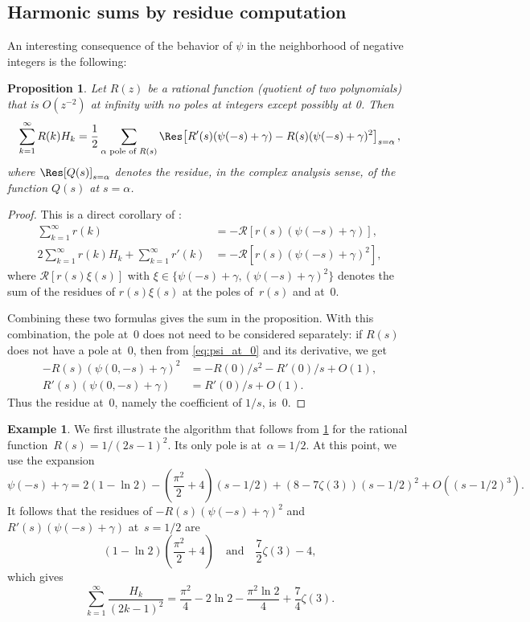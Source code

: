 \documentclass{article}
\newtheorem{proposition}{Proposition}
\theoremstyle{definition}
\newtheorem{example}{Example}
\begin{document}
\subsection{Harmonic sums by residue computation}

An interesting consequence of the behavior of $\psi$ in the neighborhood of negative integers is the following:
\begin{proposition} 
\label{thm:lem1}
Let $R(z)$ be a rational function (quotient of two polynomials) that is $O(z^{-2})$ at infinity with no poles at integers except possibly at 0. Then
\begin{equation}
\sum_{k=1}^\infty R(k) H_k = 
\frac12\sum_{\alpha \text{ pole of } R(s)}
\Res\!\left[R'(s)
(\psi(-s)+\gamma)-R(s) (\psi(-s) + \gamma)^2\right]_{s=\alpha}, \label{form:BSlemma}
\end{equation}
where $\Res [Q(s)]_{s=\alpha}$ denotes the residue, in the complex analysis sense, of the function $Q(s)$ at $s = \alpha$.
\end{proposition}
\begin{proof}
This is a direct corollary of \cite[Eqs.~(2-6) and (2-9)]{FlajoletSalvy}:
\begin{align*}
\sum_{k=1}^\infty{r(k)}&=-\mathcal R[r(s)(\psi(-s)+\gamma)],\\
2\sum_{k=1}^\infty{r(k)H_k}+\sum_{k=1}^\infty{r'(k)}&=
-\mathcal R[r(s)(\psi(-s)+\gamma)^2],
\end{align*}
where $\mathcal R[r(s)\xi(s)]$ with $\xi\in\{\psi (-s)+\gamma,(\psi(-s)+\gamma)^2\}$ denotes the sum of the residues of $r(s)\xi(s)$ at the poles of~$r(s)$ and at~0.

Combining these two formulas gives the sum in the proposition. With this combination, the pole at~0 does not need to be considered separately: if $R(s)$ does not have a pole at~0, then from  \cref{eq:psi_at_0} and its derivative, we get 
\begin{align*}
-R(s)(\psi(0,-s)+\gamma)^2 &= -R(0)/s^2 - R'(0)/s + O(1),\\
R'(s)(\psi(0,-s)+\gamma) &=R'(0)/s+O(1).
\end{align*}
Thus the residue at~0, namely the coefficient of $1/s$, is~0.
\end{proof}

\begin{example}
We first illustrate the algorithm that follows from \cref{thm:lem1} for the rational function~$R(s)=1/(2s-1)^2$. Its only pole is at~$\alpha=1/2$. At this point, we use the expansion
\[\psi(-s)+\gamma=2(1-\ln 2)-\left(\frac{\pi^2}2+4\right)(s-1/2)+
(8-7\zeta(3))(s-1/2)^2+O((s-1/2)^3).\]
It follows that the residues of $-R(s)(\psi(-s)+\gamma)^2$ and $R'(s) (\psi(-s)+\gamma)$ at~$s=1/2$ are
\[(1-\ln 2)\left(\frac{\pi^2}2+4\right) \quad\text{and}\quad \frac72\zeta(3)-4, \]
which gives
\[\sum_{k=1}^\infty{\frac{H_k}{(2k-1)^2}}=\frac{\pi^2}4-2\ln 2-\frac{\pi^2\ln 2}4+\frac74\zeta(3).\]
\end{example}
\end{document}
